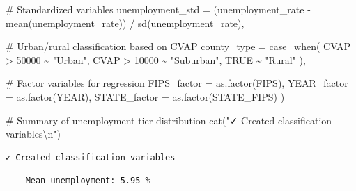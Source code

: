 \documentclass[
  11pt,
]{article}
\newenvironment{Shaded}{\begin{snugshade}}{\end{snugshade}}
\newcommand{\AttributeTok}[1]{\textcolor[rgb]{0.40,0.45,0.13}{#1}}
\newcommand{\CommentTok}[1]{\textcolor[rgb]{0.37,0.37,0.37}{#1}}
\newcommand{\ConstantTok}[1]{\textcolor[rgb]{0.56,0.35,0.01}{#1}}
\newcommand{\DecValTok}[1]{\textcolor[rgb]{0.68,0.00,0.00}{#1}}
\newcommand{\FunctionTok}[1]{\textcolor[rgb]{0.28,0.35,0.67}{#1}}
\newcommand{\NormalTok}[1]{\textcolor[rgb]{0.00,0.23,0.31}{#1}}
\newcommand{\SpecialCharTok}[1]{\textcolor[rgb]{0.37,0.37,0.37}{#1}}
\newcommand{\StringTok}[1]{\textcolor[rgb]{0.13,0.47,0.30}{#1}}
\begin{document}
\begin{Shaded}
\begin{Highlighting}[]
    \CommentTok{\# Standardized variables}
    \AttributeTok{unemployment\_std =}\NormalTok{ (unemployment\_rate }\SpecialCharTok{{-}} \FunctionTok{mean}\NormalTok{(unemployment\_rate)) }\SpecialCharTok{/} 
                       \FunctionTok{sd}\NormalTok{(unemployment\_rate),}
    
    \CommentTok{\# Urban/rural classification based on CVAP}
    \AttributeTok{county\_type =} \FunctionTok{case\_when}\NormalTok{(}
\NormalTok{      CVAP }\SpecialCharTok{\textgreater{}} \DecValTok{50000} \SpecialCharTok{\textasciitilde{}} \StringTok{"Urban"}\NormalTok{,}
\NormalTok{      CVAP }\SpecialCharTok{\textgreater{}} \DecValTok{10000} \SpecialCharTok{\textasciitilde{}} \StringTok{"Suburban"}\NormalTok{,}
      \ConstantTok{TRUE} \SpecialCharTok{\textasciitilde{}} \StringTok{"Rural"}
\NormalTok{    ),}
    
    \CommentTok{\# Factor variables for regression}
    \AttributeTok{FIPS\_factor =} \FunctionTok{as.factor}\NormalTok{(FIPS),}
    \AttributeTok{YEAR\_factor =} \FunctionTok{as.factor}\NormalTok{(YEAR),}
    \AttributeTok{STATE\_factor =} \FunctionTok{as.factor}\NormalTok{(STATE\_FIPS)}
\NormalTok{  )}

\CommentTok{\# Summary of unemployment tier distribution}
\FunctionTok{cat}\NormalTok{(}\StringTok{"✓ Created classification variables}\SpecialCharTok{\textbackslash{}n}\StringTok{"}\NormalTok{)}
\end{Highlighting}
\end{Shaded}

\begin{verbatim}
✓ Created classification variables
\end{verbatim}

\begin{Shaded}
\end{Shaded}

\begin{verbatim}
  - Mean unemployment: 5.95 %
\end{verbatim}

\begin{Shaded}
\end{Shaded}
\end{document}
